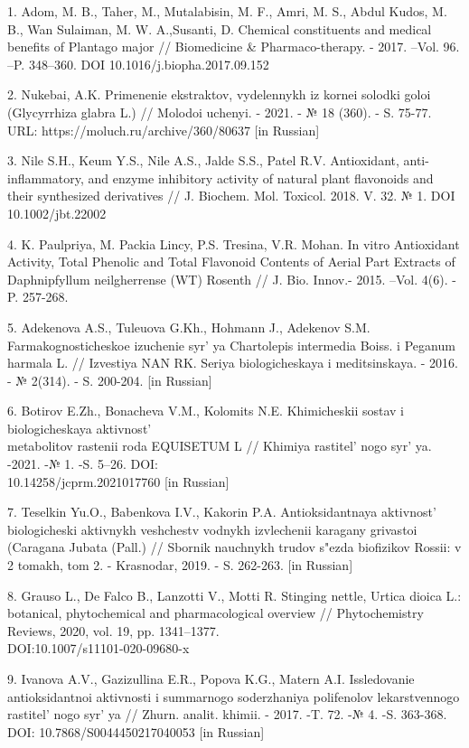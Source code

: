 \begin{references}
1. Adom, M. B., Taher, M., Mutalabisin, M. F., Amri, M. S., Abdul Kudos,
M. B., Wan Sulaiman, M. W. A.,Susanti, D. Chemical constituents and
medical benefits of Plantago major // Biomedicine \& Pharmaco-therapy.
- 2017. --Vol. 96. --P. 348--360. DOI 10.1016/j.biopha.2017.09.152

2. Nukebai, A.K. Primenenie ekstraktov, vydelennykh iz kornei solodki
goloi (Glycyrrhiza glabra L.) // Molodoi uchenyi. - 2021. - № 18
(360). - S. 75-77. URL: https://moluch.ru/archive/360/80637 {[}in
Russian{]}

3. Nile S.H., Keum Y.S., Nile A.S., Jalde S.S., Patel R.V. Antioxidant,
anti-inflammatory, and enzyme inhibitory activity of natural plant
flavonoids and their synthesized derivatives // J. Biochem. Mol.
Toxicol. 2018. V. 32. № 1. DOI 10.1002/jbt.22002

4. K. Paulpriya, M. Packia Lincy, P.S. Tresina, V.R. Mohan. In vitro
Antioxidant Activity, Total Phenolic and Total Flavonoid Contents of
Aerial Part Extracts of Daphnipfyllum neilgherrense (WT) Rosenth // J.
Bio. Innov.- 2015. --Vol. 4(6). - P. 257-268.

5. Adekenova A.S., Tuleuova G.Kh., Hohmann J., Adekenov S.M.
Farmakognosticheskoe izuchenie syr' ya Chartolepis
intermedia Boiss. i Peganum harmala L. // Izvestiya NAN RK. Seriya
biologicheskaya i meditsinskaya. - 2016. - № 2(314). - S. 200-204.
{[}in Russian{]}

6. Botirov E.Zh., Bonacheva V.M., Kolomits N.E. Khimicheskii sostav i
biologicheskaya aktivnost'{}\\ metabolitov rastenii roda
EQUISETUM L // Khimiya rastitel' nogo
syr' ya. -2021. -№ 1. -S. 5--26. DOI:
\\10.14258/jcprm.2021017760 {[}in Russian{]}

7. Teselkin Yu.O., Babenkova I.V., Kakorin P.A. Antioksidantnaya
aktivnost'{} biologicheski aktivnykh veshchestv vodnykh
izvlechenii karagany grivastoi (Caragana Jubata (Pall.) // Sbornik
nauchnykh trudov s"ezda biofizikov Rossii: v 2 tomakh, tom 2. -
Krasnodar, 2019. - S. 262-263. {[}in Russian{]}

8. Grauso L., De Falco B., Lanzotti V., Motti R. Stinging nettle, Urtica
dioica L.: botanical, phytochemical and pharmacological overview //
Phytochemistry Reviews, 2020, vol. 19, pp. 1341--1377.
\\DOI:10.1007/s11101-020-09680-x

9. Ivanova A.V., Gazizullina E.R., Popova K.G., Matern A.I. Issledovanie
antioksidantnoi aktivnosti i summarnogo soderzhaniya polifenolov
lekarstvennogo rastitel' nogo syr' ya //
Zhurn. analit. khimii. - 2017. -T. 72. -№ 4. -S. 363-368. DOI:
10.7868/S0044450217040053 {[}in Russian{]}


\end{references}
